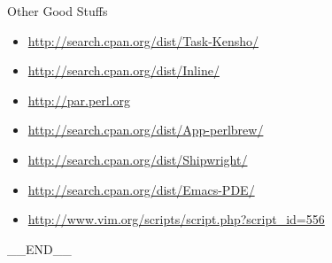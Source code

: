 \documentclass{beamer}
\begin{document}
\begin{frame}{Other Good Stuffs}
  \begin{itemize}
    \item \url{http://search.cpan.org/dist/Task-Kensho/}
    \item \url{http://search.cpan.org/dist/Inline/}
    \item \url{http://par.perl.org}
    \item \url{http://search.cpan.org/dist/App-perlbrew/}
    \item \url{http://search.cpan.org/dist/Shipwright/}
    \item \url{http://search.cpan.org/dist/Emacs-PDE/}
    \item \url{http://www.vim.org/scripts/script.php?script_id=556}
  \end{itemize}
\end{frame}

\begin{frame}
  \begin{center}
    \_\_END\_\_
  \end{center}
\end{frame}
\end{document}
